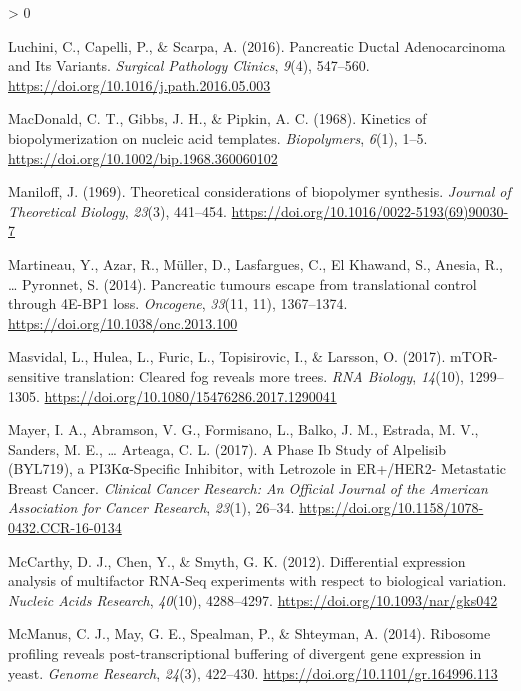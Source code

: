 \documentclass[
  12pt,
  openany]{book}
\newlength{\cslhangindent}
\newenvironment{CSLReferences}[2] %
 {%
  \setlength{\parindent}{0pt}
  \ifodd #1 \everypar{\setlength{\hangindent}{\cslhangindent}}\ignorespaces\fi
  \ifnum #2 > 0
  \setlength{\parskip}{#2\baselineskip}
  \fi
 }%
 {}
\begin{document}
\begin{CSLReferences}{1}{0}
\leavevmode\hypertarget{ref-Luchini2016}{}%
Luchini, C., Capelli, P., \& Scarpa, A. (2016). Pancreatic {Ductal Adenocarcinoma} and {Its Variants}. \emph{Surgical Pathology Clinics}, \emph{9}(4), 547--560. \url{https://doi.org/10.1016/j.path.2016.05.003}

\leavevmode\hypertarget{ref-MacDonald1968}{}%
MacDonald, C. T., Gibbs, J. H., \& Pipkin, A. C. (1968). Kinetics of biopolymerization on nucleic acid templates. \emph{Biopolymers}, \emph{6}(1), 1--5. \url{https://doi.org/10.1002/bip.1968.360060102}

\leavevmode\hypertarget{ref-Maniloff1969}{}%
Maniloff, J. (1969). Theoretical considerations of biopolymer synthesis. \emph{Journal of Theoretical Biology}, \emph{23}(3), 441--454. \url{https://doi.org/10.1016/0022-5193(69)90030-7}

\leavevmode\hypertarget{ref-Martineau2014}{}%
Martineau, Y., Azar, R., Müller, D., Lasfargues, C., El Khawand, S., Anesia, R., \ldots{} Pyronnet, S. (2014). Pancreatic tumours escape from translational control through {4E}-{BP1} loss. \emph{Oncogene}, \emph{33}(11, 11), 1367--1374. \url{https://doi.org/10.1038/onc.2013.100}

\leavevmode\hypertarget{ref-Masvidal2017}{}%
Masvidal, L., Hulea, L., Furic, L., Topisirovic, I., \& Larsson, O. (2017). {mTOR}-sensitive translation: {Cleared} fog reveals more trees. \emph{RNA Biology}, \emph{14}(10), 1299--1305. \url{https://doi.org/10.1080/15476286.2017.1290041}

\leavevmode\hypertarget{ref-Mayer2017}{}%
Mayer, I. A., Abramson, V. G., Formisano, L., Balko, J. M., Estrada, M. V., Sanders, M. E., \ldots{} Arteaga, C. L. (2017). A {Phase Ib Study} of {Alpelisib} ({BYL719}), a {PI3Kα}-{Specific Inhibitor}, with {Letrozole} in {ER}+/{HER2}- {Metastatic Breast Cancer}. \emph{Clinical Cancer Research: An Official Journal of the American Association for Cancer Research}, \emph{23}(1), 26--34. \url{https://doi.org/10.1158/1078-0432.CCR-16-0134}

\leavevmode\hypertarget{ref-McCarthy2012}{}%
McCarthy, D. J., Chen, Y., \& Smyth, G. K. (2012). Differential expression analysis of multifactor {RNA}-{Seq} experiments with respect to biological variation. \emph{Nucleic Acids Research}, \emph{40}(10), 4288--4297. \url{https://doi.org/10.1093/nar/gks042}

\leavevmode\hypertarget{ref-McManus2014}{}%
McManus, C. J., May, G. E., Spealman, P., \& Shteyman, A. (2014). Ribosome profiling reveals post-transcriptional buffering of divergent gene expression in yeast. \emph{Genome Research}, \emph{24}(3), 422--430. \url{https://doi.org/10.1101/gr.164996.113}


\end{CSLReferences}
\end{document}

